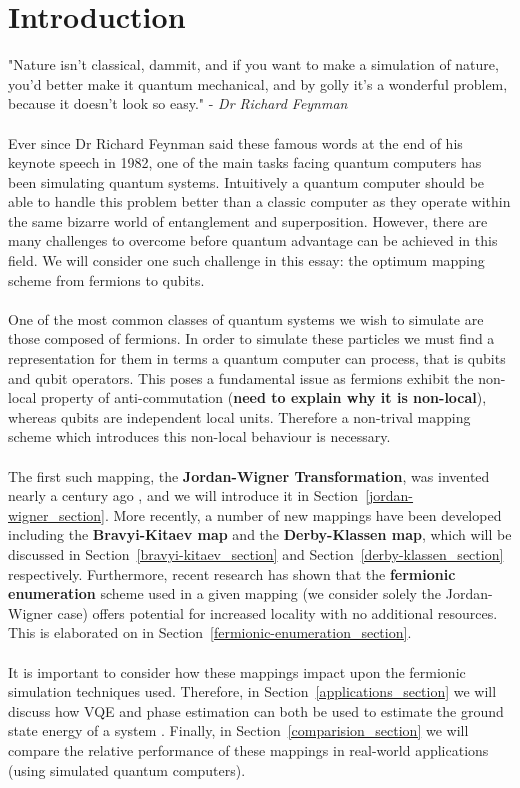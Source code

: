 \documentclass[twoside]{article}
\begin{document}
\section{Introduction}
"Nature isn't classical, dammit, and if you want to make a simulation of nature, you'd better make it quantum mechanical, and by golly it's a wonderful problem, because it doesn't look so easy." - \textsl{Dr Richard Feynman} \cite{feynmann} \\\\
Ever since Dr Richard Feynman said these famous words at the end of his keynote speech in 1982, one of the main tasks facing quantum computers has been simulating quantum systems. Intuitively a quantum computer should be able to handle this problem better than a classic computer as they operate within the same bizarre world of entanglement and superposition. However, there are many challenges to overcome before quantum advantage can be achieved in this field. We will consider one such challenge in this essay: the optimum mapping scheme from fermions to qubits.\\\\
One of the most common classes of quantum systems we wish to simulate are those composed of fermions. In order to simulate these particles we must find a representation for them in terms a quantum computer can process, that is qubits and qubit operators. This poses a fundamental issue as fermions exhibit the non-local property of anti-commutation (\textbf{need to explain why it is non-local}), whereas qubits are independent local units. Therefore a non-trival mapping scheme which introduces this non-local behaviour is necessary.\\\\
The first such mapping, the \textbf{Jordan-Wigner Transformation}, was invented nearly a century ago \cite{originalJordanWigner}, and we will introduce it in Section~\ref{jordan-wigner_section}. More recently, a number of new mappings have been developed including the \textbf{Bravyi-Kitaev map} and the \textbf{Derby-Klassen map}, which will be discussed in Section~\ref{bravyi-kitaev_section} and Section~\ref{derby-klassen_section} respectively. Furthermore, recent research \cite{fermionicEncoding} has shown that the \textbf{fermionic enumeration} scheme used in a given mapping (we consider solely the Jordan-Wigner case) offers potential for increased locality with no additional resources. This is elaborated on in Section~\ref{fermionic-enumeration_section}.\\\\
It is important to consider how these mappings impact upon the fermionic simulation techniques used. Therefore, in Section~\ref{applications_section} we will discuss how VQE and phase estimation can both be used to estimate the ground state energy of a system . Finally,  in Section~\ref{comparision_section} we will compare the relative performance of these mappings in real-world applications (using simulated quantum computers).
\end{document}
